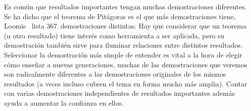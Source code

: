  Es común que resultados importantes
  tengan muchas demostraciones diferentes.
  Se ha dicho que el teorema de Pitágoras%
  es el que más demostraciones tiene,
  Loomis~\cite{loomis68:_pythag_propos}
  lista 367~demostraciones distintas.
  Hay que considerar que un teorema (u otro resultado)
  tiene interés como herramienta a ser aplicada,
  pero su demostración
  también sirve para iluminar relaciones entre distintos resultados.
  Seleccionar la demostración más simple de entender
  es vital a la hora de elegir cómo enseñar a nuevas generaciones,
  muchas de las demostraciones que veremos
  son radicalmente diferentes
  a las demostraciones originales de los mismos resultados
  (a veces incluso cubren el tema en forma mucho más amplia).
  Contar con varias demostraciones independientes
  de resultados importantes
  además ayuda a aumentar la confianza en ellos.


